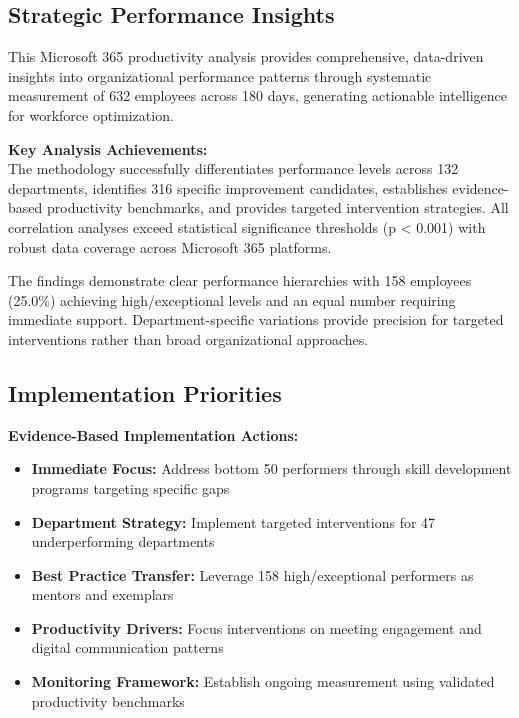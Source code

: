 \documentclass[12pt,a4paper]{article}
\begin{document}
\subsection{Strategic Performance Insights}

This Microsoft 365 productivity analysis provides comprehensive, data-driven insights into organizational performance patterns through systematic measurement of 632 employees across 180 days, generating actionable intelligence for workforce optimization.

\begin{highlightbox}
\textbf{\faCheckCircle \quad Key Analysis Achievements:}\\[0.5em]
The methodology successfully differentiates performance levels across 132 departments, identifies 316 specific improvement candidates, establishes evidence-based productivity benchmarks, and provides targeted intervention strategies. All correlation analyses exceed statistical significance thresholds (p < 0.001) with robust data coverage across Microsoft 365 platforms.
\end{highlightbox}

The findings demonstrate clear performance hierarchies with 158 employees (25.0\%) achieving high/exceptional levels and an equal number requiring immediate support. Department-specific variations provide precision for targeted interventions rather than broad organizational approaches.

\subsection{Implementation Priorities}

\begin{featurebox}
\textbf{Evidence-Based Implementation Actions:}
\begin{itemize}
    \item \textbf{Immediate Focus:} Address bottom 50 performers through skill development programs targeting specific gaps
    \item \textbf{Department Strategy:} Implement targeted interventions for 47 underperforming departments
    \item \textbf{Best Practice Transfer:} Leverage 158 high/exceptional performers as mentors and exemplars
    \item \textbf{Productivity Drivers:} Focus interventions on meeting engagement and digital communication patterns
    \item \textbf{Monitoring Framework:} Establish ongoing measurement using validated productivity benchmarks
\end{itemize}
\end{featurebox}
\end{document}
